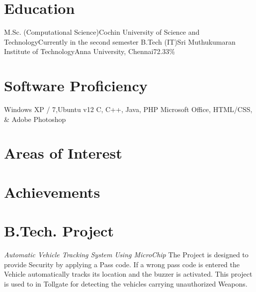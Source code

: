 \documentclass [a4paper,11pt]{moderncv}
\begin{document}
\maketitle
{}
\fontsize{11}{15}
\selectfont
\section{Education}
 {M.Sc. (Computational Science)}{Cochin University of Science and Technology}{}{\newline{}Currently in the second semester}{}
 {B.Tech (IT)}{Sri Muthukumaran Institute of Technology}{Anna University, Chennai}{72.33\%}{}

\section{Software Proficiency}
 {Windows XP / 7,Ubuntu v12}
 {C, C++, Java, PHP}
 {Microsoft Office, HTML/CSS, \& Adobe Photoshop}

\section {Areas of Interest}

\section {Achievements}

\section {B.Tech. Project}
\cvline {} {\emph{Automatic Vehicle Tracking System Using MicroChip}}
\cvline {} {The Project is designed to provide Security by applying a Pass code. If a wrong pass code is entered the Vehicle automatically tracks its location and the buzzer is activated. This project is used to in Tollgate for detecting the vehicles carrying unauthorized Weapons.}
\end{document}
